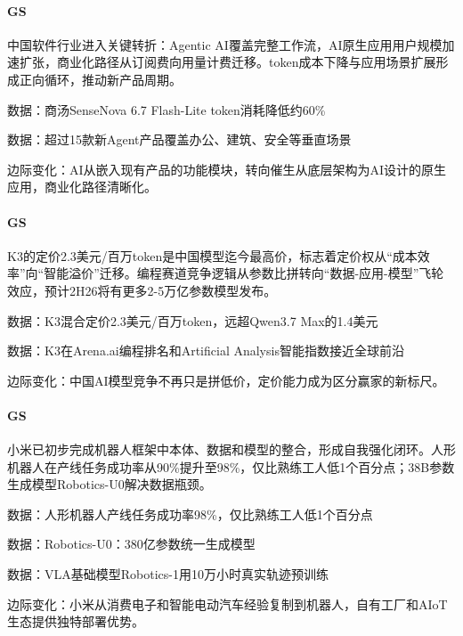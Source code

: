 \documentclass[11pt]{ctexart}
\begin{document}
\paragraph{GS} 中国软件行业进入关键转折：Agentic AI覆盖完整工作流，AI原生应用用户规模加速扩张，商业化路径从订阅费向用量计费迁移。token成本下降与应用场景扩展形成正向循环，推动新产品周期。
{\small\color{refgray}数据：商汤SenseNova 6.7 Flash-Lite token消耗降低约60\%\par}
{\small\color{refgray}数据：超过15款新Agent产品覆盖办公、建筑、安全等垂直场景\par}
{\small\color{refgray}边际变化：AI从嵌入现有产品的功能模块，转向催生从底层架构为AI设计的原生应用，商业化路径清晰化。\par}
\paragraph{GS} K3的定价2.3美元/百万token是中国模型迄今最高价，标志着定价权从“成本效率”向“智能溢价”迁移。编程赛道竞争逻辑从参数比拼转向“数据-应用-模型”飞轮效应，预计2H26将有更多2-5万亿参数模型发布。
{\small\color{refgray}数据：K3混合定价2.3美元/百万token，远超Qwen3.7 Max的1.4美元\par}
{\small\color{refgray}数据：K3在Arena.ai编程排名和Artificial Analysis智能指数接近全球前沿\par}
{\small\color{refgray}边际变化：中国AI模型竞争不再只是拼低价，定价能力成为区分赢家的新标尺。\par}
\paragraph{GS} 小米已初步完成机器人框架中本体、数据和模型的整合，形成自我强化闭环。人形机器人在产线任务成功率从90\%提升至98\%，仅比熟练工人低1个百分点；38B参数生成模型Robotics-U0解决数据瓶颈。
{\small\color{refgray}数据：人形机器人产线任务成功率98\%，仅比熟练工人低1个百分点\par}
{\small\color{refgray}数据：Robotics-U0：380亿参数统一生成模型\par}
{\small\color{refgray}数据：VLA基础模型Robotics-1用10万小时真实轨迹预训练\par}
{\small\color{refgray}边际变化：小米从消费电子和智能电动汽车经验复制到机器人，自有工厂和AIoT生态提供独特部署优势。\par}
\end{document}
